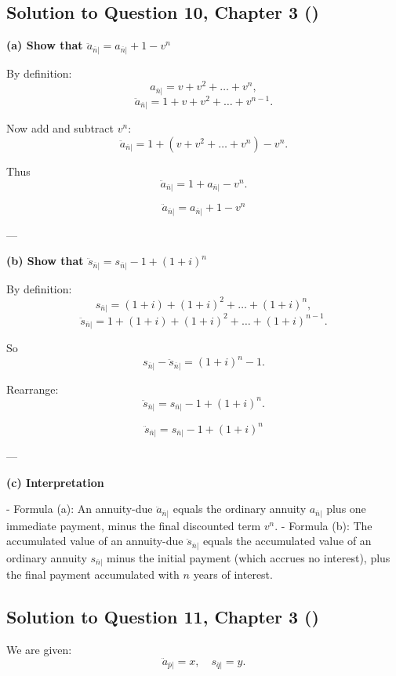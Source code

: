 \documentclass[12pt, a4paper]{article}
\begin{document}
\subsection*{Solution to Question 10, Chapter 3 (\cite{toi3rd})}

\textbf{(a) Show that $\ddot{a}_{\overline{n}|} = a_{\overline{n}|} + 1 - v^n$}

By definition:
\[
a_{\overline{n}|} = v + v^2 + \dots + v^n,
\]
\[
\ddot{a}_{\overline{n}|} = 1 + v + v^2 + \dots + v^{n-1}.
\]

Now add and subtract $v^n$:
\[
\ddot{a}_{\overline{n}|} = 1 + (v + v^2 + \dots + v^n) - v^n.
\]

Thus
\[
\ddot{a}_{\overline{n}|} = 1 + a_{\overline{n}|} - v^n.
\]

\[
\boxed{\ddot{a}_{\overline{n}|} = a_{\overline{n}|} + 1 - v^n}
\]

---

\textbf{(b) Show that $\ddot{s}_{\overline{n}|} = s_{\overline{n}|} - 1 + (1+i)^n$}

By definition:
\[
s_{\overline{n}|} = (1+i) + (1+i)^2 + \dots + (1+i)^n,
\]
\[
\ddot{s}_{\overline{n}|} = 1 + (1+i) + (1+i)^2 + \dots + (1+i)^{n-1}.
\]

So
\[
s_{\overline{n}|} - \ddot{s}_{\overline{n}|} = (1+i)^n - 1.
\]

Rearrange:
\[
\ddot{s}_{\overline{n}|} = s_{\overline{n}|} - 1 + (1+i)^n.
\]

\[
\boxed{\ddot{s}_{\overline{n}|} = s_{\overline{n}|} - 1 + (1+i)^n}
\]

---

\textbf{(c) Interpretation}

- Formula (a): An annuity-due $\ddot{a}_{\overline{n}|}$ equals the ordinary annuity $a_{\overline{n}|}$ plus one immediate payment, minus the final discounted term $v^n$.  
- Formula (b): The accumulated value of an annuity-due $\ddot{s}_{\overline{n}|}$ equals the accumulated value of an ordinary annuity $s_{\overline{n}|}$ minus the initial payment (which accrues no interest), plus the final payment accumulated with $n$ years of interest.


\subsection*{Solution to Question 11, Chapter 3 (\cite{toi3rd})}

We are given:
\[
\ddot{a}_{\overline{p}|} = x, 
\quad s_{\overline{q}|} = y.
\]
\end{document}
